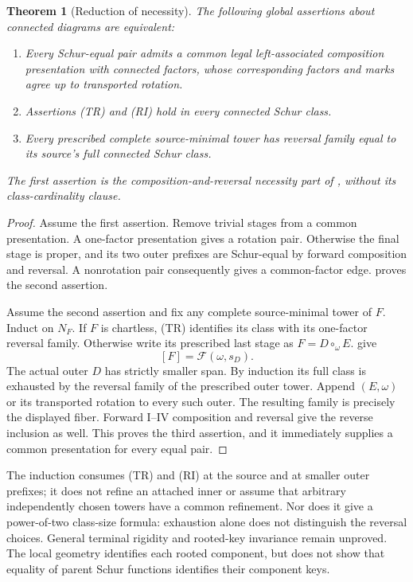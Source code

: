 \documentclass[11pt,a4paper]{amsart}
\numberwithin{equation}{section}
\theoremstyle{plain}
\newtheorem{theorem}{Theorem}[section]
\theoremstyle{definition}
\begin{document}
\begin{theorem}[Reduction of necessity]\label{thm:necessity-reduction}
The following global assertions about connected diagrams are equivalent:
\begin{enumerate}
\item Every Schur-equal pair admits a common legal left-associated composition presentation with connected factors, whose corresponding factors and marks agree up to transported rotation.
\item Assertions (TR) and (RI) hold in every connected Schur class.
\item Every prescribed complete source-minimal tower has reversal family equal to its source's full connected Schur class.
\end{enumerate}
The first assertion is the composition-and-reversal necessity part of \cite[Conjecture~5.7]{McNamara2009Classification}, without its class-cardinality clause.
\end{theorem}
\begin{proof}
Assume the first assertion.  Remove trivial stages from a common presentation.  A one-factor presentation gives a rotation pair.  Otherwise the final stage is proper, and its two outer prefixes are Schur-equal by forward composition and reversal.  A nonrotation pair consequently gives a common-factor edge.   proves the second assertion.

Assume the second assertion and fix any complete source-minimal tower of \(F\).  Induct on \(N_F\).  If \(F\) is chartless, (TR) identifies its class with its one-factor reversal family.  Otherwise write its prescribed last stage as \(F=D\circ_\omega E\).   give
\[
 [F]=\mathcal F(\omega,s_D).
\]
The actual outer \(D\) has strictly smaller span.  By induction its full class is exhausted by the reversal family of the prescribed outer tower.  Append \((E,\omega)\) or its transported rotation to every such outer.  The resulting family is precisely the displayed fiber.  Forward I--IV composition and reversal give the reverse inclusion as well.  This proves the third assertion, and it immediately supplies a common presentation for every equal pair.
\end{proof}

The induction consumes (TR) and (RI) at the source and at smaller outer prefixes; it does not refine an attached inner or assume that arbitrary independently chosen towers have a common refinement.  Nor does it give a power-of-two class-size formula: exhaustion alone does not distinguish the reversal choices.  General terminal rigidity and rooted-key invariance remain unproved.  The local geometry identifies each rooted component, but does not show that equality of parent Schur functions identifies their component keys.
\end{document}

